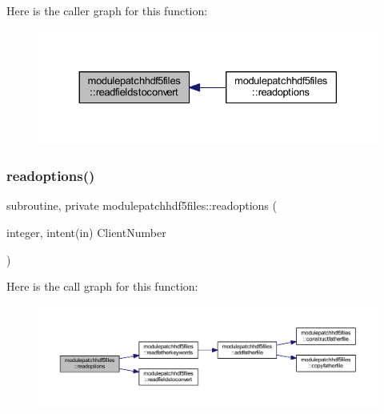 Here is the caller graph for this function\+:\nopagebreak
\begin{figure}[H]
\begin{center}
\leavevmode
\includegraphics[width=330pt]{namespacemodulepatchhdf5files_aae8026a08167779d4648093b3ace8cc4_icgraph}
\end{center}
\end{figure}
\mbox{\label{namespacemodulepatchhdf5files_a420e1d0c6143b57bc6eeb40569ba53d7}} 
\subsubsection{\texorpdfstring{readoptions()}{readoptions()}}
{\footnotesize\ttfamily subroutine, private modulepatchhdf5files\+::readoptions (\begin{DoxyParamCaption}\item[{integer, intent(in)}]{Client\+Number }\end{DoxyParamCaption})\hspace{0.3cm}{\ttfamily [private]}}

Here is the call graph for this function\+:\nopagebreak
\begin{figure}[H]
\begin{center}
\leavevmode
\includegraphics[width=350pt]{namespacemodulepatchhdf5files_a420e1d0c6143b57bc6eeb40569ba53d7_cgraph}
\end{center}
\end{figure}
\mbox{\label{namespacemodulepatchhdf5files_aaa235a83ab0f98b8c034c89125019a93}} 
